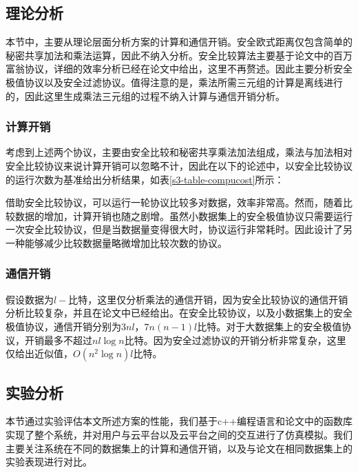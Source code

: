 \subsection{理论分析}
本节中，主要从理论层面分析方案的计算和通信开销。安全欧式距离仅包含简单的秘密共享加法和乘法运算，因此不纳入分析。安全比较算法主要基于论文\cite{rathee2020cryptflow2}中的百万富翁协议，详细的效率分析已经在论文中给出，这里不再赘述。因此主要分析安全极值协议以及安全过滤协议。值得注意的是，乘法所需三元组的计算是离线进行的，因此这里生成乘法三元组的过程不纳入计算与通信开销分析。
\subsubsection{计算开销}
考虑到上述两个协议，主要由安全比较和秘密共享乘法加法组成，乘法与加法相对安全比较协议来说计算开销可以忽略不计，因此在以下的论述中，以安全比较协议的运行次数为基准给出分析结果，如表\ref{s3-table-compucost}所示：
\begin{table}[htbp]
	\centering
	\renewcommand{\arraystretch}{1.3}
	\caption{通信开销}
	\label{s3-table-compucost}
\end{table}

借助安全比较协议，可以运行一轮协议比较多对数据，效率非常高。然而，随着比较数据的增加，计算开销也随之剧增。虽然小数据集上的安全极值协议只需要运行一次安全比较协议，但是当数据量变得很大时，协议运行非常耗时。因此设计了另一种能够减少比较数据量略微增加比较次数的协议。

\subsubsection{通信开销}
假设数据为$ l- $比特，这里仅分析乘法的通信开销，因为安全比较协议的通信开销分析比较复杂，并且在论文\cite{rathee2020cryptflow2}中已经给出。在安全比较协议，以及小数据集上的安全极值协议，通信开销分别为$ 3nl $，$ 7n(n-1)l $比特。对于大数据集上的安全极值协议，开销最多不超过$ nl\log n $比特。因为安全过滤协议的开销分析非常复杂，这里仅给出近似值，$ O(n^2\log n)l $比特。
\subsection{实验分析}
本节通过实验评估本文所述方案的性能，我们基于c++编程语言和论文\cite{rathee2020cryptflow2}中的函数库实现了整个系统，并对用户与云平台以及云平台之间的交互进行了仿真模拟。我们主要关注系统在不同的数据集上的计算和通信开销，以及与论文\cite{wu2020secure,mohassel2019practical,jaschke2019unsupervised}在相同数据集上的实验表现进行对比。

